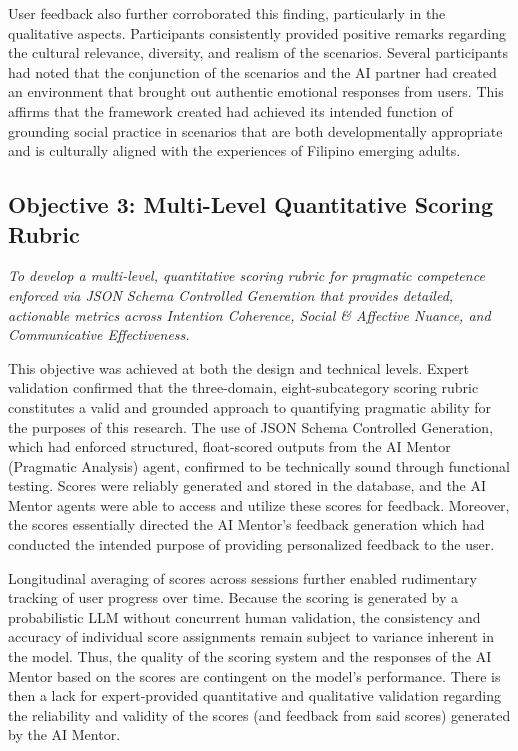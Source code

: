 User feedback also further corroborated this finding, particularly in the qualitative aspects. Participants consistently
provided positive remarks regarding the cultural relevance, diversity, and realism
of the scenarios. Several participants had noted that the conjunction of the scenarios and the AI partner had 
created an environment that brought out authentic emotional responses from users. This affirms that the framework created had achieved its
intended function of grounding social practice in scenarios that are both
developmentally appropriate and is culturally aligned with the experiences of Filipino emerging adults.


\subsection*{Objective 3: Multi-Level Quantitative Scoring Rubric}

\textit{To develop a multi-level, quantitative scoring rubric for pragmatic
competence enforced via JSON Schema Controlled Generation that provides
detailed, actionable metrics across Intention Coherence, Social \& Affective
Nuance, and Communicative Effectiveness.}

\medskip

This objective was achieved at both the design and technical levels. Expert
validation confirmed that the three-domain, eight-subcategory scoring rubric
constitutes a valid and  grounded approach to quantifying pragmatic ability for the purposes of this research. 
The use of JSON Schema Controlled Generation, which had enforced structured,
float-scored outputs from the AI Mentor (Pragmatic Analysis) agent, confirmed
to be technically sound through functional testing. Scores were reliably generated and stored in the database,
and the AI Mentor agents were able to access and utilize these scores for feedback. Moreover, the scores essentially directed the AI Mentor's
feedback generation which had conducted the intended purpose of providing personalized feedback to the user.

Longitudinal averaging of scores across sessions further enabled
rudimentary tracking of user progress over time. Because the scoring
is generated by a probabilistic LLM without concurrent human validation, the
consistency and accuracy of individual score assignments remain subject to variance
inherent in the model. Thus, the quality of the scoring system and the responses of the AI Mentor
based on the scores are contingent on the model's performance. There is then a lack for expert-provided quantitative and 
qualitative validation regarding the reliability and validity of the scores (and feedback from said scores) generated by the AI Mentor.

